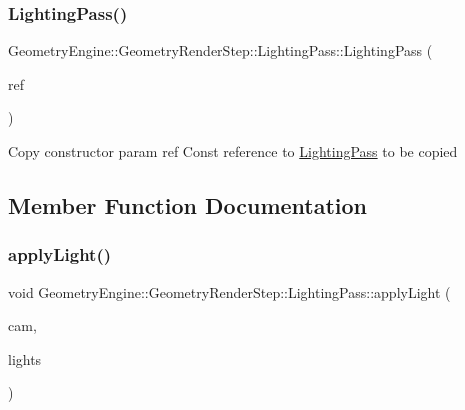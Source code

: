 \subsubsection{\texorpdfstring{LightingPass()}{LightingPass()}}
{\footnotesize\ttfamily Geometry\+Engine\+::\+Geometry\+Render\+Step\+::\+Lighting\+Pass\+::\+Lighting\+Pass (\begin{DoxyParamCaption}\item[{const \mbox{\hyperlink{class_geometry_engine_1_1_geometry_render_step_1_1_lighting_pass}{Lighting\+Pass}} \&}]{ref }\end{DoxyParamCaption})\hspace{0.3cm}{\ttfamily [inline]}}

Copy constructor param ref Const reference to \mbox{\hyperlink{class_geometry_engine_1_1_geometry_render_step_1_1_lighting_pass}{Lighting\+Pass}} to be copied 

\subsection{Member Function Documentation}
\mbox{\label{class_geometry_engine_1_1_geometry_render_step_1_1_lighting_pass_a9d0a0f3b9d52036b9d4f9fbee353cd10}} 
\subsubsection{\texorpdfstring{applyLight()}{applyLight()}}
{\footnotesize\ttfamily void Geometry\+Engine\+::\+Geometry\+Render\+Step\+::\+Lighting\+Pass\+::apply\+Light (\begin{DoxyParamCaption}\item[{\mbox{\hyperlink{class_geometry_engine_1_1_geometry_world_item_1_1_geometry_camera_1_1_camera}{Geometry\+World\+Item\+::\+Geometry\+Camera\+::\+Camera}} $\ast$}]{cam,  }\item[{std\+::unordered\+\_\+set$<$ \mbox{\hyperlink{class_geometry_engine_1_1_geometry_world_item_1_1_geometry_light_1_1_light}{Geometry\+World\+Item\+::\+Geometry\+Light\+::\+Light}} $\ast$ $>$ $\ast$}]{lights }\end{DoxyParamCaption})\hspace{0.3cm}{\ttfamily [protected]}}

